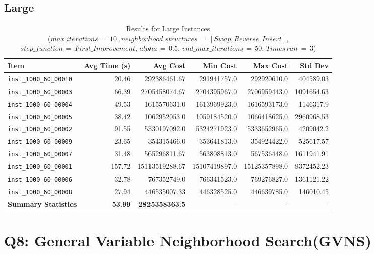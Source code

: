 \documentclass{article}
\begin{document}
\subsection*{Large}
\begin{table}[H]
	\centering
      \caption{Results for Large Instances \\($max\_iterations \,{=}\, 10\,, neighborhood\_structures \,{=}\, [Swap, Reverse, Insert]$, $step\_function \,{=}\, First\_Improvement$, $alpha \,{=}\, 0.5$, $vnd\_max\_iterations \,{=}\, 50$, $Times\, ran \,{=}\, 3$)}
    \hspace*{-2cm}
	\begin{tabular}{lrrrrr}
		\toprule
		\textbf{Item} & \textbf{Avg Time (s)} & \textbf{Avg Cost} & \textbf{Min Cost} & \textbf{Max Cost} & \textbf{Std Dev} \\
		\midrule
		\texttt{inst\_1000\_60\_00010} & 20.46 & 292386461.67 & 291941757.0 & 292920610.0 & 404589.03 \\ \texttt{inst\_1000\_60\_00003} & 66.39 & 2705458074.67 & 2704395967.0 & 2706959443.0 & 1091654.63 \\ \texttt{inst\_1000\_60\_00004} & 49.53 & 1615570631.0 & 1613969923.0 & 1616593173.0 & 1146317.9 \\ \texttt{inst\_1000\_60\_00005} & 38.42 & 1062952053.0 & 1059184520.0 & 1066418625.0 & 2960968.53 \\ \texttt{inst\_1000\_60\_00002} & 91.55 & 5330197092.0 & 5324271923.0 & 5333652965.0 & 4209042.2 \\ \texttt{inst\_1000\_60\_00009} & 23.65 & 354315466.0 & 353641813.0 & 354924422.0 & 525617.57 \\ \texttt{inst\_1000\_60\_00007} & 31.48 & 565296811.67 & 563808813.0 & 567536448.0 & 1611941.91 \\ \texttt{inst\_1000\_60\_00001} & 157.72 & 15113519288.67 & 15107419897.0 & 15125357898.0 & 8372452.23 \\ \texttt{inst\_1000\_60\_00006} & 32.78 & 767352749.0 & 766341523.0 & 769276827.0 & 1361121.22 \\ \texttt{inst\_1000\_60\_00008} & 27.94 & 446535007.33 & 446328525.0 & 446639785.0 & 146010.45 \\ \midrule \textbf{Summary Statistics} & \textbf{53.99} & \textbf{2825358363.5} & - & - & - \\
		\bottomrule
	\end{tabular}
	\label{tab:large_performance_metrics_grasp}
\end{table}

\section*{Q8: General Variable Neighborhood Search(GVNS)}
\end{document}
